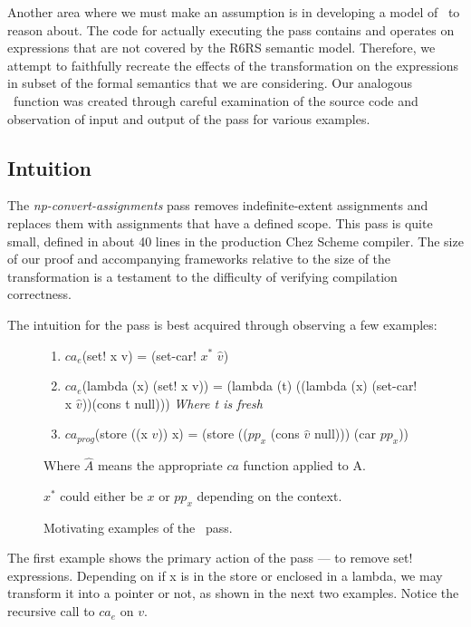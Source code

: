 Another area where we must make an assumption is in developing a model of \caname\ to reason about. The code for actually executing the pass contains and operates on expressions that are not covered by the R6RS semantic model. Therefore, we attempt to faithfully recreate the effects of the transformation on the expressions in subset of the formal semantics that we are considering. Our analogous \caname\ function was created through careful examination of the source code and observation of input and output of the pass for various examples.

\subsection{Intuition}
The \textit{np-convert-assignments} pass removes indefinite-extent assignments and replaces them with assignments that have a defined scope. This pass is quite small, defined in about 40 lines in the production Chez Scheme compiler. The size of our proof and accompanying frameworks relative to the size of the transformation is a testament to the difficulty of verifying compilation correctness.

The intuition for the pass is best acquired through observing a few examples:

\begin{figure}[h]
    \centering
    \begin{enumerate}
        \item $ca_{e}$(set! x v) = (set-car! $x^{*}$ $\hat{v}$)
        \item $ca_{e}$(lambda (x) (set! x v)) = \newline (lambda (t) ((lambda (x) (set-car! x $\hat{v}$))(cons t null))) \newline \textit{Where t is fresh}
        \item $ca_{prog}$(store ((x $v$)) x) = (store (($pp_x$ (cons $\hat{v}$ null))) (car $pp_x$))
    \end{enumerate}
    Where $\hat{A}$ means the appropriate $ca$ function applied to A.
    
    $x^{*}$ could either be $x$ or $pp_x$ depending on the context.
    \caption{Motivating examples of the \caname \ pass.}
    \label{fig:ca_examples}
\end{figure}

The first example shows the primary action of the pass --- to remove set! expressions. Depending on if x is in the store or enclosed in a lambda, we may transform it into a pointer or not, as shown in the next two examples. Notice the recursive call to $ca_e$ on $v$.

